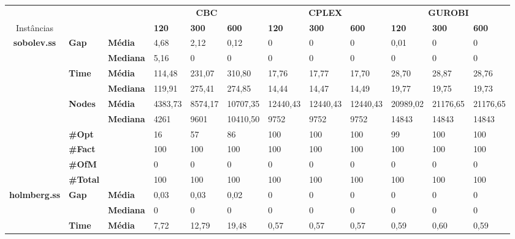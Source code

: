 \documentclass[]{article}
\begin{document}
	\begin{table}[]
		\begin{adjustbox}{angle=90}
			\begin{tabular}{cll|lll|lll|lll}
				& & & \multicolumn{3}{c}{\textbf{CBC}} & \multicolumn{3}{c}{\textbf{CPLEX}} & \multicolumn{3}{c}{\textbf{GUROBI}} 	\\Instâncias & & & \textbf{120} & \textbf{300} & \textbf{600} & \textbf{120} & \textbf{300} & \textbf{600} & \textbf{120} & \textbf{300} & \textbf{600} \\
				\hline
				\multirow{7}{*}{\textbf{sobolev.ss}} & \multirow{2}{*}{\textbf{Gap}} & \textbf{Média} & 4,68 & 2,12 & 0,12 & 0 & 0 & 0 & 0,01 & 0 & 0 \\
				& & \textbf{Mediana} & 5,16 & 0 & 0 & 0 & 0 & 0 & 0 & 0 & 0 \\
				\cline{2-12}
				& \multirow{2}{*}{\textbf{Time}} & \textbf{Média} & 114,48 & 231,07 & 310,80 & 17,76 & 17,77 & 17,70 & 28,70 & 28,87 & 28,76 \\
				& & \textbf{Mediana} & 119,91 & 275,41 & 274,85 & 14,44 & 14,47 & 14,49 & 19,77 & 19,75 & 19,73 \\
				\cline{2-12}
				& \multirow{2}{*}{\textbf{Nodes}} & \textbf{Média} & 4383,73 & 8574,17 & 10707,35 & 12440,43 & 12440,43 & 12440,43 & 20989,02 & 21176,65 & 21176,65 \\
				& & \textbf{Mediana} & 4261 & 9601 & 10410,50 & 9752 & 9752 & 9752 & 14843 & 14843 & 14843 \\
				\cline{2-12}
				& \textbf{\#Opt} & & 16 & 57 & 86 & 100 & 100 & 100 & 99 & 100 & 100 \\
				& \textbf{\#Fact} & & 100 & 100 & 100 & 100 & 100 & 100 & 100 & 100 & 100 \\
				& \textbf{\#OfM} & & 0 & 0 & 0 & 0 & 0 & 0 & 0 & 0 & 0 \\
				& \textbf{\#Total} & & 100 & 100 & 100 & 100 & 100 & 100 & 100 & 100 & 100 \\
				\hline
				\multirow{7}{*}{\textbf{holmberg.ss}} & \multirow{2}{*}{\textbf{Gap}} & \textbf{Média} & 0,03 & 0,03 & 0,02 & 0 & 0 & 0 & 0 & 0 & 0 \\
				& & \textbf{Mediana} & 0 & 0 & 0 & 0 & 0 & 0 & 0 & 0 & 0 \\
				\cline{2-12}
				& \multirow{2}{*}{\textbf{Time}} & \textbf{Média} & 7,72 & 12,79 & 19,48 & 0,57 & 0,57 & 0,57 & 0,59 & 0,60 & 0,59 \\

\end{tabular}
\end{adjustbox}
\end{table}
\end{document}
